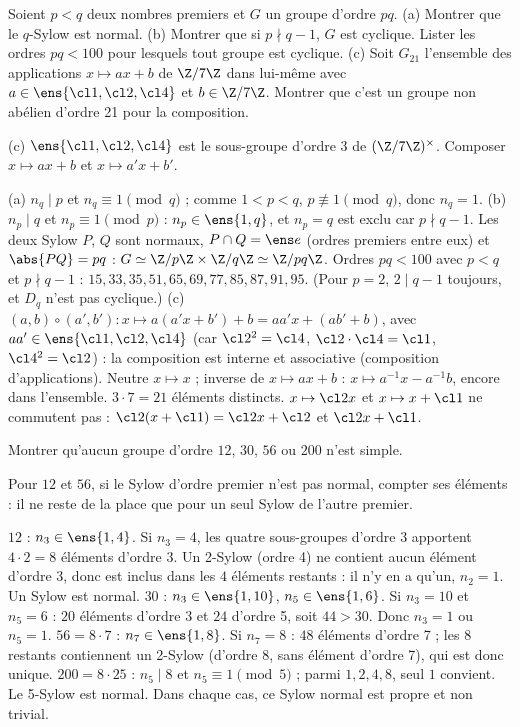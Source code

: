 \begin{exo}\label{exo-pq}
Soient $p<q$ deux nombres premiers et $G$ un groupe d'ordre $pq$. (a) Montrer que le $q$-Sylow est normal. (b) Montrer que si $p\nmid q-1$, $G$ est cyclique. Lister les ordres $pq<100$ pour lesquels tout groupe est cyclique. (c) Soit $G_{21}$ l'ensemble des applications $x\mapsto ax+b$ de $\Z/7\Z$ dans lui-même avec $a\in\ens{\cl1,\cl2,\cl4}$ et $b\in\Z/7\Z$. Montrer que c'est un groupe non abélien d'ordre 21 pour la composition.
\begin{indication}
(c) $\ens{\cl1,\cl2,\cl4}$ est le sous-groupe d'ordre 3 de $(\Z/7\Z)^\times$. Composer $x\mapsto ax+b$ et $x\mapsto a'x+b'$.
\end{indication}
\begin{corrige}
(a) $n_q\mid p$ et $n_q\equiv1\pmod q$ ; comme $1<p<q$, $p\not\equiv1\pmod q$, donc $n_q=1$.
(b) $n_p\mid q$ et $n_p\equiv1\pmod p$ : $n_p\in\ens{1,q}$, et $n_p=q$ est exclu car $p\nmid q-1$. Les deux Sylow $P$, $Q$ sont normaux, $P\cap Q=\ens e$ (ordres premiers entre eux) et $\abs{PQ}=pq$ : $G\simeq\Z/p\Z\times\Z/q\Z\simeq\Z/pq\Z$. Ordres $pq<100$ avec $p<q$ et $p\nmid q-1$ : $15,33,35,51,65,69,77,85,87,91,95$. (Pour $p=2$, $2\mid q-1$ toujours, et $D_q$ n'est pas cyclique.)
(c) $(a,b)\circ(a',b'):x\mapsto a(a'x+b')+b=aa'x+(ab'+b)$, avec $aa'\in\ens{\cl1,\cl2,\cl4}$ (car $\cl2^2=\cl4$, $\cl2\cdot\cl4=\cl1$, $\cl4^2=\cl2$) : la composition est interne et associative (composition d'applications). Neutre $x\mapsto x$ ; inverse de $x\mapsto ax+b$ : $x\mapsto a^{-1}x-a^{-1}b$, encore dans l'ensemble. $3\cdot7=21$ éléments distincts. $x\mapsto\cl2x$ et $x\mapsto x+\cl1$ ne commutent pas : $\cl2(x+\cl1)=\cl2x+\cl2$ et $\cl2x+\cl1$.
\end{corrige}
\end{exo}

\begin{exo}
Montrer qu'aucun groupe d'ordre $12$, $30$, $56$ ou $200$ n'est simple.
\begin{indication}
Pour $12$ et $56$, si le Sylow d'ordre premier n'est pas normal, compter ses éléments : il ne reste de la place que pour un seul Sylow de l'autre premier.
\end{indication}
\begin{corrige}
$12$ : $n_3\in\ens{1,4}$. Si $n_3=4$, les quatre sous-groupes d'ordre 3 apportent $4\cdot2=8$ éléments d'ordre 3. Un 2-Sylow (ordre 4) ne contient aucun élément d'ordre 3, donc est inclus dans les $4$ éléments restants : il n'y en a qu'un, $n_2=1$. Un Sylow est normal.
$30$ : $n_3\in\ens{1,10}$, $n_5\in\ens{1,6}$. Si $n_3=10$ et $n_5=6$ : $20$ éléments d'ordre 3 et $24$ d'ordre 5, soit $44>30$. Donc $n_3=1$ ou $n_5=1$.
$56=8\cdot7$ : $n_7\in\ens{1,8}$. Si $n_7=8$ : $48$ éléments d'ordre 7 ; les $8$ restants contiennent un 2-Sylow (d'ordre 8, sans élément d'ordre 7), qui est donc unique.
$200=8\cdot25$ : $n_5\mid8$ et $n_5\equiv1\pmod5$ ; parmi $1,2,4,8$, seul $1$ convient. Le 5-Sylow est normal.
Dans chaque cas, ce Sylow normal est propre et non trivial.
\end{corrige}
\end{exo}

